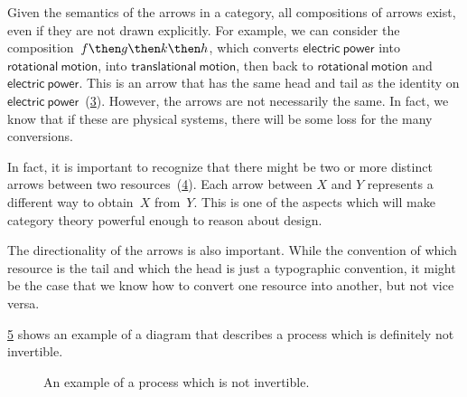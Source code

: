 \begin{remark}
\begin{figure}[h!]
    \centering
    \caption{\label{fig:e6}}
\end{figure}


\begin{figure}[h!]
    \centering
    \caption{\label{fig:e6-together}}
\end{figure}

Given the semantics of the arrows in a category, all compositions of arrows exist, even if they are not drawn
explicitly. For example, we can consider the composition~$f\then g \then k \then h$, which
converts $\mathsf{electric}\ \mathsf{power}$ into $\mathsf{rotational}\ \mathsf{motion}$, into $\mathsf{translational}\ \mathsf{motion}$, then back to
$\mathsf{rotational}\ \mathsf{motion}$ and $\mathsf{electric}\ \mathsf{power}$. This is an arrow that has the same head and tail as the identity on $\mathsf{electric}\ \mathsf{power}$~(\cref{fig:e8}). However, the arrows are not necessarily the same. In fact, we know that if these are physical systems, there will be some loss for the many conversions.

\begin{figure}[h!]
    \centering
    \caption{\label{fig:e8}}
\end{figure}

In fact, it is important to recognize that there might be two or more distinct arrows between two resources~(\cref{fig:e9}). Each arrow between $X$ and $Y$ represents a different way  to obtain~$X$ from~$Y$. This is one of the aspects which will make category theory powerful enough to reason about design.

\begin{figure}[h!]
    \centering
    \caption{\label{fig:e9}}
\end{figure}

The directionality of the arrows is also important. While the convention of
which resource is the tail and which the head is just a typographic convention,
it might be the case that we know how to convert one resource into another, but
not vice versa.

\cref{fig:e10} shows an example of a diagram that describes a process which is definitely
not invertible.

\begin{figure}[h!]
    \centering
    \caption{An example of a process which is not invertible. \label{fig:e10}}
\end{figure}


\end{remark}
